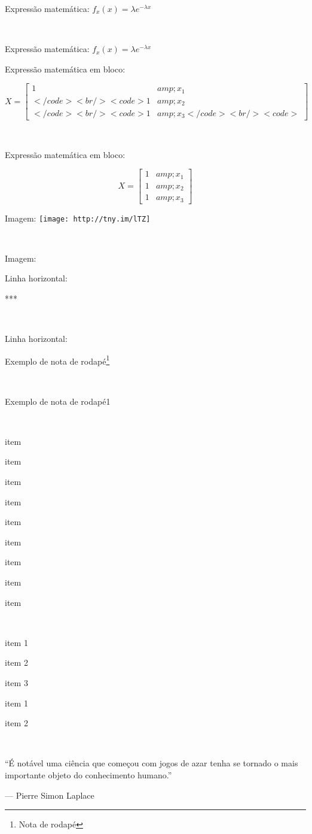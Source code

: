 \documentclass[
]{book}
\begin{document}
Expressão matemática:
\(f_x(x) = \lambda e^{- \lambda x}\)

~

Expressão matemática: {\(f_x(x) = \lambda e^{- \lambda x}\)}

Expressão matemática em bloco:

\[X = \begin{bmatrix}1 &amp; x_{1}\\</code><br />
<code>1 &amp; x_{2}\\</code><br />
<code>1 &amp; x_{3}</code><br />
<code>\end{bmatrix}\]

~

Expressão matemática em bloco:

{\[X = \begin{bmatrix}1 &amp; x_{1}\\
1 &amp; x_{2}\\
1 &amp; x_{3}
\end{bmatrix}\]}

Imagem: \texttt{[image: http://tny.im/lTZ]}

~

Imagem:

Linha horizontal:

***

~

Linha horizontal:

Exemplo de nota de rodapé\footnote{Nota de rodapé}

~

Exemplo de nota de rodapé1

~

item

item

item

item

item

item

item

item

item

~

item 1

item 2

item 3

item 1

item 2

~

``É notável uma ciência que começou com jogos de azar tenha se tornado o mais importante objeto do conhecimento humano.''

--- Pierre Simon Laplace
\end{document}
